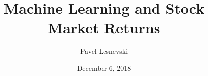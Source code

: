 \documentclass{beamer}
\title[]{ \textbf{Machine Learning and Stock Market Returns}}  %
\author[Pavel Lesnevski]{Pavel Lesnevski }
\institute[University of Mannheim]{University of Mannheim}
\date{December 6, 2018} %
\begin{document}
\begin{frame}
\titlepage %
\end{frame}


\end{document}
